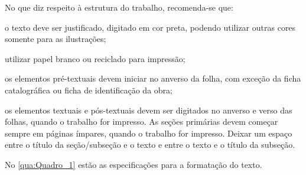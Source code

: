 No que diz respeito à estrutura do trabalho, recomenda-se que:
\begin{alineas}
	\item o texto deve ser justificado, digitado em cor preta, podendo utilizar outras cores somente para as ilustrações;
	\item utilizar papel branco ou reciclado para impressão;
	\item os elementos pré-textuais devem iniciar no anverso da folha, com exceção da ficha catalográfica ou ficha de identificação da obra;
	\item os elementos textuais e pós-textuais devem ser digitados no anverso e verso das folhas, quando o trabalho for impresso. As seções primárias devem começar sempre em páginas ímpares, quando o trabalho for impresso. Deixar um espaço entre o título da seção/subseção e o texto e entre o texto e o título da subseção.
\end{alineas}

No \autoref{qua:Quadro_1} estão as especificações para a formatação do texto.

